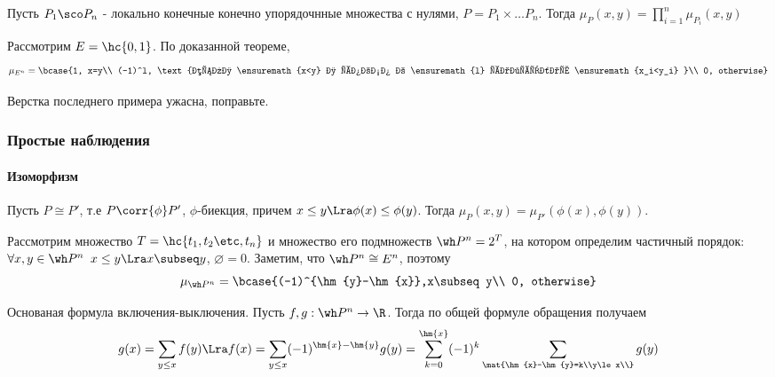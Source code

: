 \documentclass[unicode,10pt]{article}
\begin{document}
\begin{imp}
  Пусть $P_1\sco P_n$ - локально конечные конечно упорядочнные
  множества с нулями, $P=P_1\times\dots P_n$. Тогда $\displaystyle \mu_P(x,y) = \prod_{i=1}^n\mu_{P_i}(x,y)$
\end{imp}
\begin{ex}
  Рассмотрим $E=\hc{0, 1}$. По доказанной теореме,
  \begin{displaymath}
    \mu_{E^n}=\bcase
       {1, x=y\\
         (-1)^l, \text{если \ensuremath{x<y} и ровно в \ensuremath{l} разрядах \ensuremath{x_i<y_i} }\\
         0, otherwise}
  \end{displaymath}
\end{ex}
\begin{authornote}
  Верстка последнего примера ужасна, поправьте.
\end{authornote}
\subsubsection{Простые наблюдения}
\paragraph{Изоморфизм}
Пусть $P\cong P'$, т.е $P\corr{\phi}P'$, $\phi$-биекция, причем $x\le y \Lra \phi(x)\le\phi(y)$.
Тогда $\mu_P(x,y)=\mu_{P'}(\phi(x),\phi(y))$.
\begin{ex}
  Рассмотрим множество $T=\hc{\set[t]{n}}$ и множество его подмножеств $\wh P^n = 2^T$, на котором
  определим частичный порядок: $\forall x,y\in\wh P^n$ $x\le y \Lra x\subseq y$, $\varnothing = 0$.
  Заметим, что $\wh P^n \cong E^n$, поэтому
  \begin{displaymath}
    \mu_{\wh P^n}=\bcase{(-1)^{\hm{y}-\hm{x}},x\subseq y\\ 0, otherwise}
  \end{displaymath}
\end{ex}
\begin{imp}
  Основаная формула включения-выключения. Пусть $f,g:\wh P^n\to\R$. Тогда по общей формуле обращения
  получаем
  \begin{displaymath}
    g(x) = \sum_{y\le x}f(y) \Lra f(x)=\sum_{y\le x}(-1)^{\hm{x}-\hm{y}}g(y)=\sum_{k=0}^{\hm{x}}(-1)^k\sum_{ \tiny\mat{\hm{x}-\hm{y}=k\\y\le x\\}}g(y)
  \end{displaymath}
\end{imp}
\end{document}
